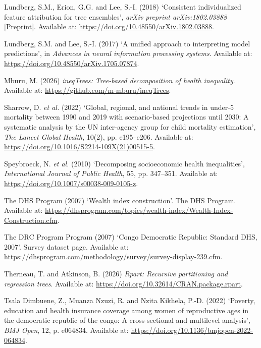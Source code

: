 \documentclass[
  11pt,
  a4paper,
]{article}
\newlength{\cslhangindent}
\newenvironment{CSLReferences}[2] %
 {\begin{list}{}{%
  \setlength{\itemindent}{0pt}
  \setlength{\leftmargin}{0pt}
  \setlength{\parsep}{0pt}
  \ifodd #1
   \setlength{\leftmargin}{\cslhangindent}
   \setlength{\itemindent}{-1\cslhangindent}
  \fi
  \setlength{\itemsep}{#2\baselineskip}}}
 {\end{list}}
\begin{document}
\begin{CSLReferences}{0}{1}
Lundberg, S.M., Erion, G.G. and Lee, S.-I. (2018) {`Consistent
individualized feature attribution for tree ensembles'}, \emph{arXiv
preprint arXiv:1802.03888} {[}Preprint{]}. Available at:
\url{https://doi.org/10.48550/arXiv.1802.03888}.

Lundberg, S.M. and Lee, S.-I. (2017) {`A unified approach to
interpreting model predictions'}, in \emph{Advances in neural
information processing systems}. Available at:
\url{https://doi.org/10.48550/arXiv.1705.07874}.

Mburu, M. (2026) \emph{ineqTrees: Tree-based decomposition of health
inequality}. Available at: \url{https://github.com/m-mburu/ineqTrees}.

{Sharrow, D. \emph{et al.}} (2022) {`Global, regional, and national
trends in under-5 mortality between 1990 and 2019 with scenario-based
projections until 2030: A systematic analysis by the UN inter-agency
group for child mortality estimation'}, \emph{The Lancet Global Health},
10(2), pp. e195--e206. Available at:
\url{https://doi.org/10.1016/S2214-109X(21)00515-5}.

Speybroeck, N. \emph{et al.} (2010) {`Decomposing socioeconomic health
inequalities'}, \emph{International Journal of Public Health}, 55, pp.
347--351. Available at: \url{https://doi.org/10.1007/s00038-009-0105-z}.

The DHS Program (2007) {`Wealth index construction'}. The DHS Program.
Available at:
\url{https://dhsprogram.com/topics/wealth-index/Wealth-Index-Construction.cfm}.

The DRC Program Program (2007) {`{Congo Democratic Republic: Standard
DHS, 2007}'}. Survey dataset page. Available at:
\url{https://dhsprogram.com/methodology/survey/survey-display-239.cfm}.

Therneau, T. and Atkinson, B. (2026) \emph{Rpart: Recursive partitioning
and regression trees}. Available at:
\url{https://doi.org/10.32614/CRAN.package.rpart}.

Tsala Dimbuene, Z., Muanza Nzuzi, R. and Nzita Kikhela, P.-D. (2022)
{`Poverty, education and health insurance coverage among women of
reproductive ages in the democratic republic of the congo: A
cross-sectional and multilevel analysis'}, \emph{BMJ Open}, 12, p.
e064834. Available at:
\url{https://doi.org/10.1136/bmjopen-2022-064834}.


\end{CSLReferences}
\end{document}
